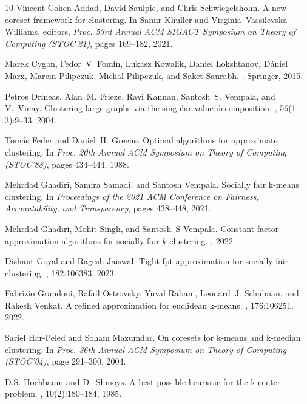 \documentclass[11pt]{article}
\begin{document}
\begin{thebibliography}{10}
Vincent Cohen{-}Addad, David Saulpic, and Chris Schwiegelshohn.
\newblock A new coreset framework for clustering.
\newblock In Samir Khuller and Virginia~Vassilevska Williams, editors, {\em Proc. 53rd Annual {ACM} {SIGACT} Symposium on Theory of Computing (STOC'21)}, pages 169--182, 2021.

Marek Cygan, Fedor~V. Fomin, Lukasz Kowalik, Daniel Lokshtanov, D{\'{a}}niel Marx, Marcin Pilipczuk, Michal Pilipczuk, and Saket Saurabh.
.
\newblock Springer, 2015.

Petros Drineas, Alan~M. Frieze, Ravi Kannan, Santosh~S. Vempala, and V.~Vinay.
\newblock Clustering large graphs via the singular value decomposition.
, 56(1-3):9--33, 2004.

Tom{\'{a}}s Feder and Daniel~H. Greene.
\newblock Optimal algorithms for approximate clustering.
\newblock In {\em Proc. 20th Annual {ACM} Symposium on Theory of Computing (STOC'88)}, pages 434--444, 1988.

Mehrdad Ghadiri, Samira Samadi, and Santosh Vempala.
\newblock Socially fair k-means clustering.
\newblock In {\em Proceedings of the 2021 ACM Conference on Fairness, Accountability, and Transparency}, pages 438--448, 2021.

Mehrdad Ghadiri, Mohit Singh, and Santosh~S Vempala.
\newblock Constant-factor approximation algorithms for socially fair $ k $-clustering.
, 2022.

Dishant Goyal and Ragesh Jaiswal.
\newblock Tight fpt approximation for socially fair clustering.
, 182:106383, 2023.

Fabrizio Grandoni, Rafail Ostrovsky, Yuval Rabani, Leonard~J. Schulman, and Rakesh Venkat.
\newblock A refined approximation for euclidean k-means.
, 176:106251, 2022.

Sariel Har-Peled and Soham Mazumdar.
\newblock On coresets for k-means and k-median clustering.
\newblock In {\em Proc. 36th Annual ACM Symposium on Theory of Computing (STOC'04)}, page 291–300, 2004.

D.S. Hochbaum and D.~Shmoys.
\newblock A best possible heuristic for the k-center problem.
, 10(2):180--184, 1985.


\end{thebibliography}
\end{document}
